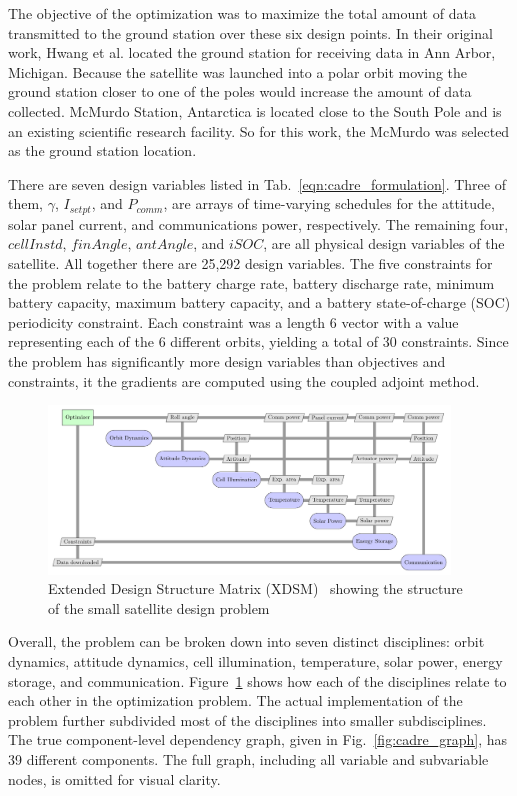 \documentclass[]{aiaa-tc} %
\begin{document}
    The objective of the optimization was to maximize the total amount of data transmitted to the ground
    station over these six design points. In their original work, Hwang et al. located the ground station
    for receiving data in Ann Arbor, Michigan. Because the satellite was launched into a polar orbit moving the ground station
    closer to one of the poles would increase the amount of data collected. McMurdo Station,
    Antarctica is located close to the South Pole and is an existing scientific research facility.
    So for this work, the McMurdo was selected as the ground station location.

    There are seven design variables listed in Tab.~\ref{eqn:cadre_formulation}.
    Three of them, $\gamma$, $I_{setpt}$, and $P_{comm}$, are arrays of time-varying schedules for the attitude,
    solar panel current, and communications power, respectively. The remaining four, $cellInstd$, $finAngle$, $antAngle$, and $iSOC$,
    are all physical design variables of the satellite. All together there are 25,292 design variables.
    The five constraints for the problem relate to the battery charge rate, battery discharge rate,
    minimum battery capacity, maximum battery capacity, and a battery state-of-charge (SOC) periodicity
    constraint. Each constraint was a length 6 vector with a value representing each of the 6 different
    orbits, yielding a total of 30 constraints. Since the problem has significantly more design
    variables than objectives and constraints, it the gradients are computed using the coupled adjoint method.


    \begin{figure}[!htbp]
        \centering
        \includegraphics[width=0.95\textwidth]{xdsm/cadre_xdsm}
        \caption{Extended Design Structure Matrix (XDSM)~\cite{Lambe2012} showing the structure of the small satellite design problem}
        \label{fig:cadre_xdsm}
    \end{figure}

    Overall, the problem can be broken down into seven distinct disciplines: orbit dynamics, attitude dynamics, cell illumination,
    temperature, solar power, energy storage, and communication. Figure~\ref{fig:cadre_xdsm} shows how each of the disciplines
    relate to each other in the optimization problem. The actual implementation of the problem further
    subdivided most of the disciplines into smaller subdisciplines. The true component-level dependency
    graph, given in Fig.~\ref{fig:cadre_graph}, has 39 different components. The full graph, including all variable and
    subvariable nodes, is omitted for visual clarity.
\end{document}
